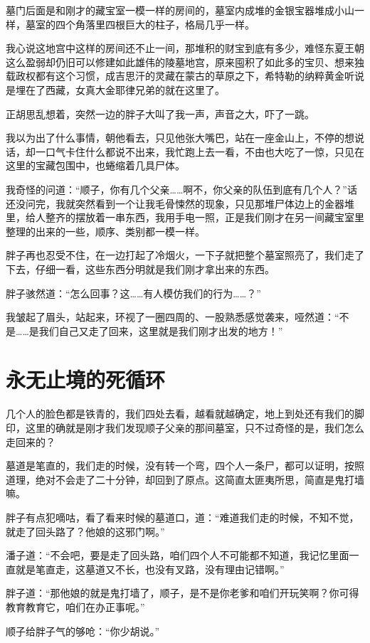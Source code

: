 墓门后面是和刚才的藏宝室一模一样的房间的，墓室内成堆的金银宝器堆成小山一样，墓室的四个角落里四根巨大的柱子，格局几乎一样。

我心说这地宫中这样的房间还不止一间，那堆积的财宝到底有多少，难怪东夏王朝这么盈弱却仍旧可以修建如此雄伟的陵墓地宫，原来囤积了如此多的宝贝、想来独载政权都有这个习惯，成吉思汗的灵藏在蒙古的草原之下，希特勒的纳粹黄金听说是埋在了西藏，女真大金耶律兄弟的就在这里了。

正胡思乱想着，突然一边的胖子大叫了我一声，声音之大，吓了一跳。

我以为出了什么事情，朝他看去，只见他张大嘴巴，站在一座金山上，不停的想说话，却一口气卡住什么都说不出来，我忙跑上去一看，不由也大吃了一惊，只见在这里的宝藏包围中，也蜷缩着几具尸体。

我奇怪的问道：“顺子，你有几个父亲……啊不，你父亲的队伍到底有几个人？”话还没问完，我就突然看到一个让我毛骨悚然的现象，只见那堆尸体边上的金器堆里，给人整齐的摆放着一串东西，我用手电一照，正是我们刚才在另一间藏宝室里整理的出来的一些，顺序、类别都一模一样。

胖子再也忍受不住，在一边打起了冷烟火，一下子就把整个墓室照亮了，我们走了下去，仔细一看，这些东西分明就是我们刚才拿出来的东西。

胖子骇然道：“怎么回事？这……有人模仿我们的行为……？”

我皱起了眉头，站起来，环视了一圈四周的、一股熟悉感觉袭来，哑然道：“不是……是我们自己又走了回来，这里就是我们刚才出发的地方！”

\chapter{永无止境的死循环}

几个人的脸色都是铁青的，我们四处去看，越看就越确定，地上到处还有我们的脚印，这里的确就是刚才我们发现顺子父亲的那间墓室，只不过奇怪的是，我们怎么走回来的？

墓道是笔直的，我们走的时候，没有转一个弯，四个人一条尸，都可以证明，按照道理，绝对不会走了二十分钟，却回到了原点。这简直太匪夷所思，简直是鬼打墙嘛。

胖子有点犯嘀咕，看了看来时候的墓道口，道：“难道我们走的时候，不知不觉，就走了回头路了？他娘的这邪门啊。”

潘子道：“不会吧，要是走了回头路，咱们四个人不可能都不知道，我记忆里面一直就是笔直走，这墓道又不长，也没有叉路，没有理由记错啊。”

胖子道：“那他娘的就是鬼打墙了，顺子，是不是你老爹和咱们开玩笑啊？你可得教育教育它，咱们在办正事呢。”

顺子给胖子气的够呛：“你少胡说。”

